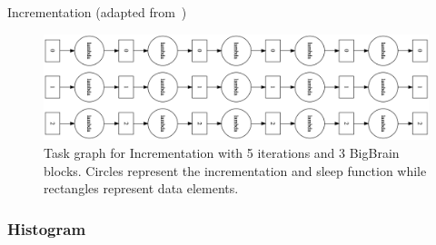 \documentclass[conference]{IEEEtran}
\begin{document}
\begin{algorithm}[!b]
    \caption{Incrementation (adapted from~\cite{hayot2019performance})}\label{alg:incrementation}
    \begin{algorithmic}
        \EndFor
    \EndFor
\end{algorithmic}
\end{algorithm}

\begin{figure}[!b]
    \centering
    \includegraphics[height=\columnwidth,
    angle=-90]{images/incrementation-task-graph.png}
    \caption{Task graph for Incrementation with 5 iterations and 3 BigBrain blocks.
    Circles represent the incrementation and sleep function while rectangles
    represent data elements.}\label{fig:tg-inc}
\end{figure}

\subsubsection{Histogram}
\end{document}
